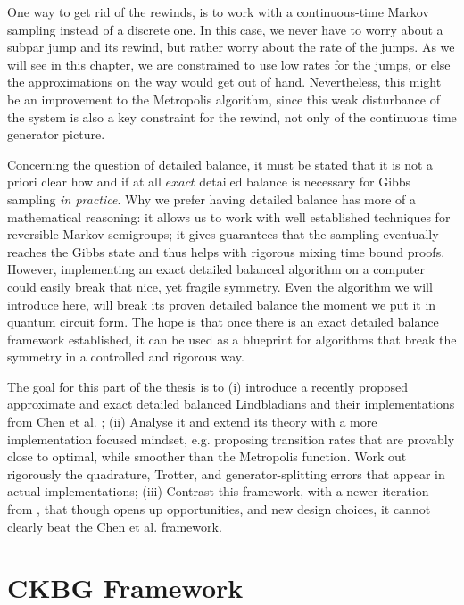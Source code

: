 One way to get rid of the rewinds, is to work with a continuous-time Markov sampling instead of a discrete one. In this case, we never have to worry about a subpar jump and its rewind, but rather worry about the rate of the jumps. As we will see in this chapter, we are constrained to use low rates for the jumps, or else the approximations on the way would get out of hand. Nevertheless, this might be an improvement to the Metropolis algorithm, since this weak disturbance of the system is also a key constraint for the rewind, not only of the continuous time generator picture.

Concerning the question of detailed balance, it must be stated that it is not a priori clear how and if at all $exact$ detailed balance is necessary for Gibbs sampling \textit{in practice}. Why we prefer having detailed balance has more of a mathematical reasoning: it allows us to work with well established techniques for reversible Markov semigroups; it gives guarantees that the sampling eventually reaches the Gibbs state and thus helps with rigorous mixing time bound proofs. However, implementing an exact detailed balanced algorithm on a computer could easily break that nice, yet fragile symmetry. Even the algorithm we will introduce here, will break its proven detailed balance the moment we put it in quantum circuit form. The hope is that once there is an exact detailed balance framework established, it can be used as a blueprint for algorithms that break the symmetry in a controlled and rigorous way. 

The goal for this part of the thesis is to (i) introduce a recently proposed approximate and exact detailed balanced Lindbladians and their implementations from Chen et al. \cite{chen2023quantum,chen2023efficient}; (ii) Analyse it and extend its theory with a more implementation focused mindset, e.g. proposing transition rates that are provably close to optimal, while smoother than the Metropolis function. Work out rigorously the quadrature, Trotter, and generator-splitting errors that appear in actual implementations; (iii) Contrast this framework, with a newer iteration from \cite{ding2025efficient}, that though opens up opportunities, and new design choices, it cannot clearly beat the Chen et al. framework. 

\chapter{CKBG Framework}
\smallskip
\label{sec:approx-gns-lindbladian}
